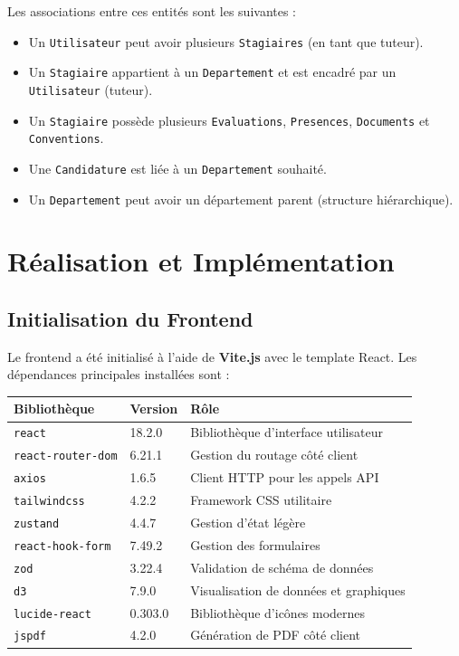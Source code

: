 Les associations entre ces entités sont les suivantes :
\begin{itemize}
    \item Un \texttt{Utilisateur} peut avoir plusieurs \texttt{Stagiaires} (en tant que tuteur).
    \item Un \texttt{Stagiaire} appartient à un \texttt{Departement} et est encadré par un \texttt{Utilisateur} (tuteur).
    \item Un \texttt{Stagiaire} possède plusieurs \texttt{Evaluations}, \texttt{Presences}, \texttt{Documents} et \texttt{Conventions}.
    \item Une \texttt{Candidature} est liée à un \texttt{Departement} souhaité.
    \item Un \texttt{Departement} peut avoir un département parent (structure hiérarchique).
\end{itemize}

\section{Réalisation et Implémentation}

\subsection{Initialisation du Frontend}
Le frontend a été initialisé à l'aide de \textbf{Vite.js} avec le template React. Les dépendances principales installées sont :

\begin{center}
\begin{tabular}{|l|l|p{6cm}|}
\hline
\textbf{Bibliothèque} & \textbf{Version} & \textbf{Rôle} \\ \hline
\texttt{react} & 18.2.0 & Bibliothèque d'interface utilisateur \\ \hline
\texttt{react-router-dom} & 6.21.1 & Gestion du routage côté client \\ \hline
\texttt{axios} & 1.6.5 & Client HTTP pour les appels API \\ \hline
\texttt{tailwindcss} & 4.2.2 & Framework CSS utilitaire \\ \hline
\texttt{zustand} & 4.4.7 & Gestion d'état légère \\ \hline
\texttt{react-hook-form} & 7.49.2 & Gestion des formulaires \\ \hline
\texttt{zod} & 3.22.4 & Validation de schéma de données \\ \hline
\texttt{d3} & 7.9.0 & Visualisation de données et graphiques \\ \hline
\texttt{lucide-react} & 0.303.0 & Bibliothèque d'icônes modernes \\ \hline
\texttt{jspdf} & 4.2.0 & Génération de PDF côté client \\ \hline
\end{tabular}
\end{center}

